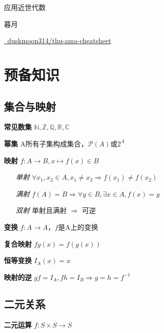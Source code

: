 \documentclass[a4paper,10pt]{ctexart}
\newcommand*{\setN}{\mathbb{N}}
\newcommand*{\setZ}{\mathbb{Z}}
\newcommand*{\setQ}{\mathbb{Q}}
\newcommand*{\setR}{\mathbb{R}}
\newcommand*{\setC}{\mathbb{C}}
\newcommand*{\powerset}[1]{\mathscr{P}(#1)}
\newcommand*{\impl}{\Rightarrow}
\begin{document}
\begin{multicols}{3}
    \begin{center}
        {\Large 应用近世代数}

        暮月

        \vspace*{-0.5em}

        \href{https://github.com/duskmoon314/thu-ama-cheatsheet}{\faGithub \  duskmoon314/thu-ama-cheatsheet}

        \vspace*{-1.5em}
    \end{center}

    \section{预备知识}

    \subsection{集合与映射}

    \textbf{常见数集} $\setN, \setZ, \setQ, \setR, \setC$

    \textbf{幂集} A所有子集构成集合，$\powerset{A}$或$2^A$

    \textbf{映射} $f: A \to B, x \mapsto f(x) \in B$

    \begin{itemize}
        \item[\emph{单射}] $\forall x_1, x_2 \!\in\! A, x_1 \!\neq\! x_2 \!\impl\! f(x_1) \!\neq\! f(x_2) $
        \item[\emph{满射}] $f(A) \! = \! B \impl \forall y \!\in\! B, \exists x \!\in\! A, f(x) = y$
        \item[\emph{双射}] 单射且满射 $\impl$ 可逆
    \end{itemize}

    \textbf{变换} $f: A \to A$，$f$是A上的变换

    \textbf{复合映射} $fg(x) = f(g(x))$

    \textbf{恒等变换} $I_A(x) = x$

    \textbf{映射的逆} $gf \! = \! I_A, fh \! = \! I_B \impl g \! = \! h \!= \! f^{-1}$

    \subsection{二元关系}

    \textbf{二元运算} $f: S \times S \to S$


\end{multicols}
\end{document}
